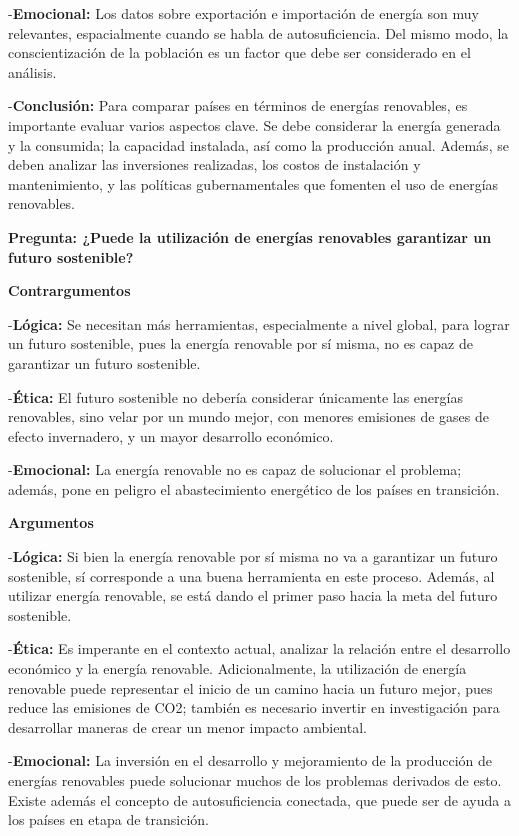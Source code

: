 \documentclass[
  letterpaper,
  DIV=11,
  numbers=noendperiod]{scrreprt}
\begin{document}
-\textbf{Emocional:} Los datos sobre exportación e importación de
energía son muy relevantes, espacialmente cuando se habla de
autosuficiencia. Del mismo modo, la conscientización de la población es
un factor que debe ser considerado en el análisis.

-\textbf{Conclusión:} Para comparar países en términos de energías
renovables, es importante evaluar varios aspectos clave. Se debe
considerar la energía generada y la consumida; la capacidad instalada,
así como la producción anual. Además, se deben analizar las inversiones
realizadas, los costos de instalación y mantenimiento, y las políticas
gubernamentales que fomenten el uso de energías renovables.

\textbf{Pregunta: ¿Puede la utilización de energías renovables
garantizar un futuro sostenible?}

\textbf{Contrargumentos}

-\textbf{Lógica:} Se necesitan más herramientas, especialmente a nivel
global, para lograr un futuro sostenible, pues la energía renovable por
sí misma, no es capaz de garantizar un futuro sostenible.

-\textbf{Ética:} El futuro sostenible no debería considerar únicamente
las energías renovables, sino velar por un mundo mejor, con menores
emisiones de gases de efecto invernadero, y un mayor desarrollo
económico.

-\textbf{Emocional:} La energía renovable no es capaz de solucionar el
problema; además, pone en peligro el abastecimiento energético de los
países en transición.

\textbf{Argumentos}

-\textbf{Lógica:} Si bien la energía renovable por sí misma no va a
garantizar un futuro sostenible, sí corresponde a una buena herramienta
en este proceso. Además, al utilizar energía renovable, se está dando el
primer paso hacia la meta del futuro sostenible.

-\textbf{Ética:} Es imperante en el contexto actual, analizar la
relación entre el desarrollo económico y la energía renovable.
Adicionalmente, la utilización de energía renovable puede representar el
inicio de un camino hacia un futuro mejor, pues reduce las emisiones de
CO2; también es necesario invertir en investigación para desarrollar
maneras de crear un menor impacto ambiental.

-\textbf{Emocional:} La inversión en el desarrollo y mejoramiento de la
producción de energías renovables puede solucionar muchos de los
problemas derivados de esto. Existe además el concepto de
autosuficiencia conectada, que puede ser de ayuda a los países en etapa
de transición.
\end{document}

